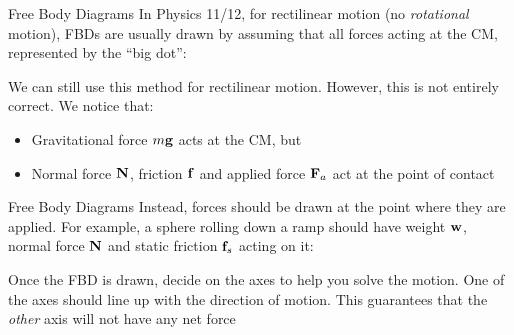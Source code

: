 \documentclass[12pt,compress,aspectratio=169]{beamer}
\newcommand{\mb}[1]{\ensuremath\mathbf{#1}}
\begin{document}
\begin{frame}{Free Body Diagrams}
  In Physics 11/12, for rectilinear motion (no \emph{rotational} motion),
  FBDs are usually drawn by assuming that all forces acting at the CM,
  represented by the ``big dot'':
  \begin{center}
  \end{center}
  \vspace{-.1in}We can still use this method for rectilinear motion. However,
  this is not entirely correct. We notice that:
  \begin{itemize}
  \item Gravitational force $m\mb{g}$ acts at the CM, but
  \item Normal force $\mb{N}$, friction $\mb{f}$ and applied force $\mb{F}_a$
    act at the point of contact
  \end{itemize}
\end{frame}



\begin{frame}{Free Body Diagrams}
  Instead, forces should be drawn at the point where they are applied. For
  example, a sphere rolling down a ramp should have weight $\mb{w}$, normal
  force $\mb{N}$ and static friction $\mb{f}_s$ acting on it:
  \begin{center}
  \end{center}
  Once the FBD is drawn, decide on the axes to help you solve the motion. One of
  the axes should line up with the direction of motion. This guarantees that the 
  \emph{other} axis will not have any net force
\end{frame}
\end{document}

